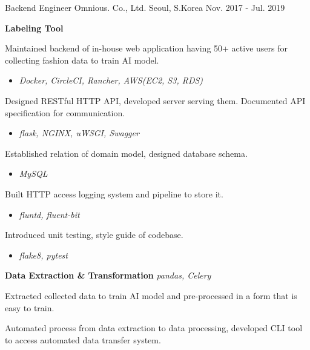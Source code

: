 \begin{cventries}
  \cventry
    {Backend Engineer} %
    {Omnious. Co., Ltd.} %
    {Seoul, S.Korea} %
    {Nov. 2017 - Jul. 2019} %
    {
      \begin{cvitems} %
        \item[] {\textbf{Labeling Tool}}
        \item {Maintained backend of in-house web application having 50+ active users for collecting fashion data to train AI model.}
        \begin{itemize}
          \item[] \textit{Docker, CircleCI, Rancher, AWS(EC2, S3, RDS)}
        \end{itemize}
        \item {Designed RESTful HTTP API, developed server serving them. Documented API specification for communication.}
        \begin{itemize}
          \item[] \textit{flask, NGINX, uWSGI, Swagger}
        \end{itemize}
        \item {Established relation of domain model, designed database schema.}
        \begin{itemize}
          \item[] \textit{MySQL}
        \end{itemize}
        \item {Built HTTP access logging system and pipeline to store it.}
        \begin{itemize}
          \item[] \textit{fluntd, fluent-bit}
        \end{itemize}
        \item {Introduced unit testing, style guide of codebase.}
        \begin{itemize}
          \item[] \textit{flake8, pytest}
        \end{itemize}
        \item[]
        \item[] {\textbf{Data Extraction \& Transformation} \hspace{1cm} \textit{pandas, Celery}}
        \item {Extracted collected data to train AI model and pre-processed in a form that is easy to train.}
        \item {Automated process from data extraction to data processing, developed CLI tool to access automated data transfer system.}

\end{cvitems}}
\end{cventries}
